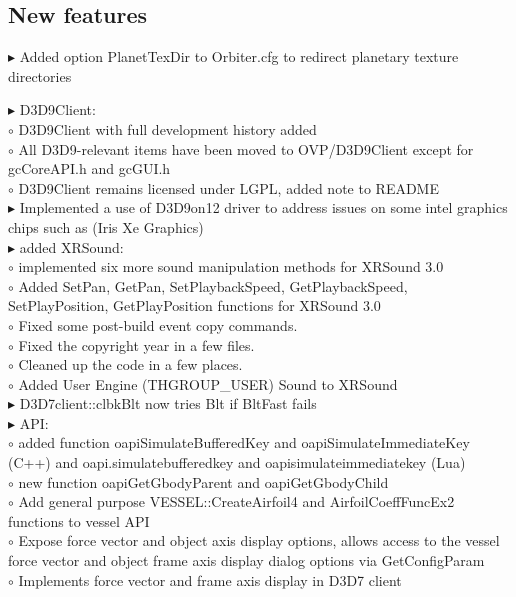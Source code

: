 \documentclass[Orbiter User Manual.tex]{subfiles}
\begin{document}
\subsection{New features}
$\blacktriangleright$ Added option PlanetTexDir to Orbiter.cfg to redirect planetary texture directories\\
\begin{sloppypar}%
$\blacktriangleright$ D3D9Client:\\
$\circ$ D3D9Client with full development history added\\
$\circ$ All D3D9-relevant items have been moved to OVP/D3D9Client except for gcCoreAPI.h and gcGUI.h\\
$\circ$ D3D9Client remains licensed under LGPL, added note to README\\
$\blacktriangleright$ Implemented a use of D3D9on12 driver to address issues on some intel graphics chips such as (Iris Xe Graphics)\\
$\blacktriangleright$ added XRSound:\\
$\circ$ implemented six more sound manipulation methods for XRSound 3.0\\
$\circ$ Added SetPan, GetPan, SetPlaybackSpeed, GetPlaybackSpeed, SetPlayPosition, GetPlayPosition functions for XRSound 3.0\\
$\circ$ Fixed some post-build event copy commands.\\
$\circ$ Fixed the copyright year in a few files.\\
$\circ$ Cleaned up the code in a few places.\\
$\circ$ Added User Engine (THGROUP\_USER) Sound to XRSound\\
$\blacktriangleright$ D3D7client::clbkBlt now tries Blt if BltFast fails\\
$\blacktriangleright$ API:\\
$\circ$ added function oapiSimulateBufferedKey and oapiSimulateImmediateKey (C++) and oapi.simulatebufferedkey and oapisimulateimmediatekey (Lua)\\
$\circ$ new function oapiGetGbodyParent and oapiGetGbodyChild\\
$\circ$ Add general purpose VESSEL::CreateAirfoil4 and AirfoilCoeffFuncEx2 functions to vessel API\\
$\circ$ Expose force vector and object axis display options, allows access to the vessel force vector and object frame axis display dialog options via GetConfigParam\\
$\circ$ Implements force vector and frame axis display in D3D7 client\\

\end{sloppypar}
\end{document}
